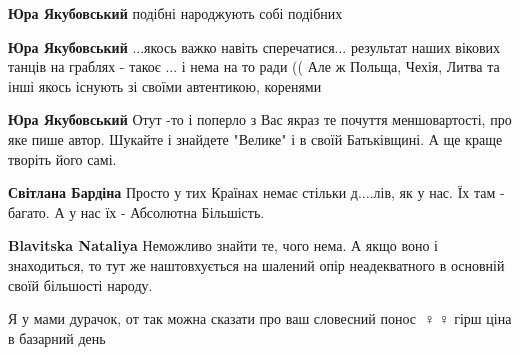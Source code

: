\begin{itemize}
\begin{itemize}
\textbf{Юра Якубовський} подібні народжують собі подібних

 
\textbf{Юра Якубовський} ...якось важко навіть сперечатися... результат наших вікових танців на граблях - такоє ... і нема на то ради ((
Але ж Польща, Чехія, Литва та інші якось існують зі своїми автентикою, коренями

 
\textbf{Юра Якубовський} Отут -то і поперло з Вас якраз те почуття меншовартості, про яке пише автор. Шукайте і знайдете "Велике" і в своїй Батьківщині. А ще краще творіть його самі.

 
\textbf{Світлана Бардіна} Просто у тих Країнах немає стільки д....лів, як у нас. Їх там - багато. А у нас їх - Абсолютна Більшість.

 
\textbf{Blavitska Nataliya} Неможливо знайти те, чого нема. А якщо воно і знаходиться, то тут же наштовхується на шалений опір неадекватного в основній своїй більшості народу.

 
Я у мами дурачок, от так можна сказати про ваш словесний понос 🤦♀️🤦♀️ гірш ціна в базарний день
\end{itemize}


\end{itemize}
